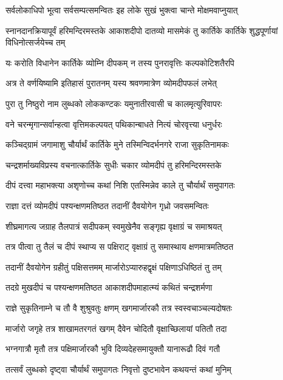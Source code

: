 \twolineshloka
{सर्वलोकाधिपो भूत्वा सर्वसम्पत्समन्वितः}
{इह लोके सुखं भुक्त्वा चान्ते मोक्षमवाप्नुयात्} %

\threelineshloka
{स्नानदानक्रियापूर्वं हरिमन्दिरमस्तके}
{आकाशदीपो दातव्यो मासमेकं तु कार्तिके}
{कार्तिके शुद्धपूर्णायां विधिनोत्सर्जयेच्च तम्} %

\twolineshloka
{यः करोति विधानेन कार्तिके व्योम्नि दीपकम्}
{न तस्य पुनरावृत्तिः कल्पकोटिशतैरपि} %

\twolineshloka
{अत्र ते वर्णयिष्यामि इतिहासं पुरातनम्}
{यस्य श्रवणमात्रेण व्योमदीपफलं लभेत्} %

\twolineshloka
{पुरा तु निष्ठुरो नाम लुब्धको लोककण्टकः}
{यमुनातीरवासी च कालमृत्युरिवापरः} %

\twolineshloka
{वने चरन्मृगान्सर्वान्हत्वा वृत्तिमकल्पयत्}
{पथिकान्बाधते नित्यं चोरवृत्त्या धनुर्धरः} %

\twolineshloka
{कञ्चिद्ग्रामं जगामाशु चौर्यार्थं कार्तिके मुने}
{तस्मिन्विदर्भनगरे राजा सुकृतिनामकः} %

\twolineshloka
{चन्द्रशर्माख्यविप्रस्य वचनात्कार्तिके सुधीः}
{चकार व्योमदीपं तु हरिमन्दिरमस्तके} %

\twolineshloka
{दीपं दत्त्वा महाभक्त्या अशृणोच्च कथां निशि}
{एतस्मिन्नेव काले तु चौर्यार्थं समुपागतः} %

\twolineshloka
{राज्ञा दत्तं व्योमदीपं पश्यन्क्षणमतिष्ठत}
{तदानीं दैवयोगेन गृध्रो जवसमन्वितः} %

\twolineshloka
{शीघ्रमागत्य जग्राह तैलपात्रं सदीपकम्}
{स्वमुखेनैव सङ्गृह्य वृक्षाग्रं च समाश्रयत्} %

\twolineshloka
{तत्र पीत्वा तु तैलं च दीपं स्थाप्य स पक्षिराट्}
{वृक्षाग्रं तु समास्थाय क्षणमात्रमतिष्ठत} %

\twolineshloka
{तदानीं दैवयोगेन ग्रहीतुं पक्षिसत्तमम्}
{मार्जारोऽप्यारुहद्वृक्षं पक्षिणाऽधिष्ठितं तु तम्} %

\twolineshloka
{तदग्रे मुखदीपं च पश्यन्क्षणमतिष्ठत}
{आकाशदीपमाहात्म्यं कथितं चन्द्रशर्मणा} %

\twolineshloka
{राज्ञे सुकृतिनाम्ने च तौ वै शुश्रुवतुः क्षणम्}
{खगमार्जारकौ तत्र स्वस्वचाञ्चल्यदोषतः} %

\twolineshloka
{मार्जारो जगृहे तत्र शाखामतरगतं खगम्}
{दैवेन चोदितौ वृक्षाच्छिलायां पतितौ तदा} %

\twolineshloka
{भग्नगात्रौ मृतौ तत्र पक्षिमार्जारकौ भुवि}
{दिव्यदेहसमायुक्तौ यानारूढौ दिवं गतौ} %

\twolineshloka
{तत्सर्वं लुब्धको दृष्ट्वा चौर्यार्थं समुपागतः}
{निवृत्तो दुष्टभावेन कथयन्तं कथां मुनिम्} %

